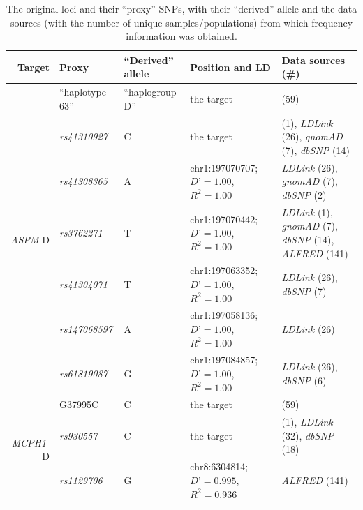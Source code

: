 \documentclass[twoside,onecolumn]{article}
\begin{document}
\begin{table}[h]
	\caption{The original loci and their ``proxy'' SNPs, with their ``derived'' allele and the data sources (with the number of unique samples/populations) from which frequency information was obtained.}
	\label{Tab:snps_in_ld}
	\centering
	\begin{tabularx}{\textwidth}{|r|X|X|X|X|}
		\toprule
		\textbf{Target} & \textbf{Proxy} & \textbf{``Derived'' allele} & \textbf{Position and LD} & \textbf{Data sources (\#)} \\
		\midrule
		\multirow{7}{*}{\textit{ASPM}-D} & ``haplotype 63'' & ``haplogroup D'' & the target & \citet{mekelbobrov_aspm_2005} (59) \\
		& \textit{rs41310927} & C & the target & \citet{wong_sciadv_2020} (1), \textit{LDLink} (26), \textit{gnomAD} (7), \textit{dbSNP} (14) \\
		& \textit{rs41308365} & A & chr1:197070707; $D’=1.00$, $R^2=1.00$ & \textit{LDLink} (26), \textit{gnomAD} (7), \textit{dbSNP} (2) \\
		& \textit{rs3762271} & T & chr1:197070442; $D’=1.00$, $R^2=1.00$ & \textit{LDLink} (1), \textit{gnomAD} (7), \textit{dbSNP} (14), \textit{ALFRED} (141) \\
		& \textit{rs41304071} & T & chr1:197063352; $D’=1.00$, $R^2=1.00$ & \textit{LDLink} (26), \textit{dbSNP} (7) \\
		& \textit{rs147068597} & A & chr1:197058136; $D’=1.00$, $R^2=1.00$ & \textit{LDLink} (26) \\
		& \textit{rs61819087} & G & chr1:197084857; $D’=1.00$, $R^2=1.00$ & \textit{LDLink} (26), \textit{dbSNP} (6) \\
		\midrule
		\multirow{3}{*}{\textit{MCPH1}-D} & G37995C & C & the target & \citet{evans_microcephalin_2005} (59) \\
		& \textit{rs930557} & C & the target & \citet{wong_sciadv_2020} (1), \textit{LDLink} (32), \textit{dbSNP} (18) \\
		& \textit{rs1129706} & G & chr8:6304814; $D’=0.995$, $R^2=0.936$ & \textit{ALFRED} (141) \\
		\bottomrule
	\end{tabularx}
\end{table}
\end{document}
